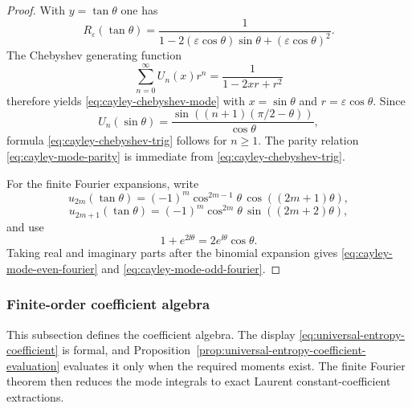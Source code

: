 \begin{proof}
With $y=\tan\theta$ one has
\[
R_\varepsilon(\tan\theta)
=\frac{1}{1-2(\varepsilon\cos\theta)\sin\theta+(\varepsilon\cos\theta)^2}.
\]
The Chebyshev generating function
\[
\sum_{n=0}^{\infty}U_n(x)r^n=\frac{1}{1-2xr+r^2}
\]
\cite[Chapters~1 and~5]{MasonHandscomb2002}
therefore yields \eqref{eq:cayley-chebyshev-mode} with
$x=\sin\theta$ and $r=\varepsilon\cos\theta$.  Since
\[
U_n(\sin\theta)
=\frac{\sin((n+1)(\pi/2-\theta))}{\cos\theta},
\]
formula \eqref{eq:cayley-chebyshev-trig} follows for $n\ge 1$.  The
parity relation \eqref{eq:cayley-mode-parity} is immediate from
\eqref{eq:cayley-chebyshev-trig}.

For the finite Fourier expansions, write
\[
u_{2m}(\tan\theta)=(-1)^m\cos^{2m-1}\theta\,\cos((2m+1)\theta),
\]
\[
u_{2m+1}(\tan\theta)=(-1)^m\cos^{2m}\theta\,\sin((2m+2)\theta),
\]
and use
\[
1+e^{2\ii\theta}=2e^{\ii\theta}\cos\theta.
\]
Taking real and imaginary parts after the binomial expansion gives
\eqref{eq:cayley-mode-even-fourier} and
\eqref{eq:cayley-mode-odd-fourier}.
\end{proof}

\subsubsection{Finite-order coefficient algebra}%
\label{subsec:finite-order-coefficient-calculus}

This subsection defines the coefficient algebra.  The display
\eqref{eq:universal-entropy-coefficient} is formal, and
Proposition~\ref{prop:universal-entropy-coefficient-evaluation} evaluates it
only when the required moments exist.  The finite Fourier theorem then reduces
the mode integrals to exact Laurent constant-coefficient extractions.


